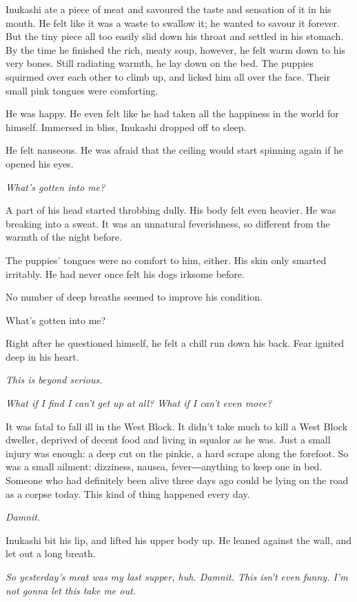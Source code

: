 Inukashi ate a piece of meat and savoured the taste and sensation of it
in his mouth. He felt like it was a waste to swallow it; he wanted to
savour it forever. But the tiny piece all too easily slid down his
throat and settled in his stomach. By the time he finished the rich,
meaty soup, however, he felt warm down to his very bones. Still
radiating warmth, he lay down on the bed. The puppies squirmed over each
other to climb up, and licked him all over the face. Their small pink
tongues were comforting.

He was happy. He even felt like he had taken all the happiness in the
world for himself. Immersed in bliss, Inukashi dropped off to sleep.

He felt nauseous. He was afraid that the ceiling would start spinning
again if he opened his eyes.

\emph{What's gotten into me?}

A part of his head started throbbing dully. His body felt even heavier.
He was breaking into a sweat. It was an unnatural feverishness, so
different from the warmth of the night before.

The puppies' tongues were no comfort to him, either. His skin only
smarted irritably. He had never once felt his dogs irksome before.

No number of deep breaths seemed to improve his condition.

What's gotten into me?

Right after he questioned himself, he felt a chill run down his back.
Fear ignited deep in his heart.

\emph{This is beyond serious.}

\emph{What if I find I can't get up at all? What if I can't even move?}

It was fatal to fall ill in the West Block. It didn't take much to kill
a West Block dweller, deprived of decent food and living in squalor as
he was. Just a small injury was enough: a deep cut on the pinkie, a hard
scrape along the forefoot. So was a small ailment: dizziness, nausea,
fever―anything to keep one in bed. Someone who had definitely been alive
three days ago could be lying on the road as a corpse today. This kind
of thing happened every day.

\emph{Damnit.}

Inukashi bit his lip, and lifted his upper body up. He leaned against
the wall, and let out a long breath.

\emph{So yesterday's meat was my last supper, huh. Damnit. This isn't even
funny. I'm not gonna let this take me out.}

